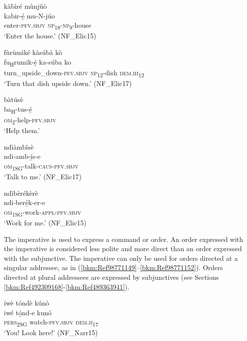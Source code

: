 \ea
kàbìré mùnjûò\\
\gll kabir-é̲    mu-N-júo\\
enter-\textsc{pfv}.\textsc{sbjv}  \textsc{np}\textsubscript{18}-\textsc{np}\textsubscript{9}-house\\
\glt ‘Enter the house.’ (NF\_Elic15)
\z

\ea
\label{bkm:Ref74908194}
fùrùmìké kàsúbà kò\\
\gll fu\textsubscript{H}rumik-é̲        ka-súba  ko\\
turn\_upside\_down-\textsc{pfv}.\textsc{sbjv}  \textsc{np}\textsubscript{12}-dish  \textsc{dem}.\textsc{iii}\textsubscript{12}\\
\glt ‘Turn that dish upside down.’ (NF\_Elic17)
\z

\ea
\label{bkm:Ref71903625}
\glll bàtúsè\\
ba\textsubscript{H}-tus-é̲\\
\textsc{om}\textsubscript{2}-help-\textsc{pfv}.\textsc{sbjv}\\
\glt ‘Help them.’
\z

\ea
\glll ndìàmbîsè\\
ndi-amb-í̲s-e\\
\textsc{om}\textsubscript{1SG}-talk-\textsc{caus}-\textsc{pfv}.\textsc{sbjv}\\
\glt ‘Talk to me.’ (NF\_Elic17)
\z

\ea
\label{bkm:Ref74908216}
\glll ndìbèrékèrè\\
ndi-beré̲k-er-e\\
\textsc{om}\textsubscript{1SG}-work-\textsc{appl}-\textsc{pfv}.\textsc{sbjv}\\
\glt ‘Work for me.’ (NF\_Elic15)
\z

The imperative is used to express a command or order. An order expressed with the imperative is considered less polite and more direct than an order expressed with the subjunctive. The imperative can only be used for orders directed at a singular addressee, as in (\ref{bkm:Ref98771149}--\ref{bkm:Ref98771152}). Orders directed at plural addressees are expressed by subjunctives (see Sections \ref{bkm:Ref492309168}-\ref{bkm:Ref489363941}).

\ea
\label{bkm:Ref98771149}
íwè tóndè kúnò\\
\gll iwé    tó̲nd-e    kunó\\
\textsc{pers}\textsubscript{2SG}  watch-\textsc{pfv}.\textsc{sbjv}  \textsc{dem}.\textsc{ii}\textsubscript{17}\\
\glt ‘You! Look here!’ (NF\_Narr15)
\z


